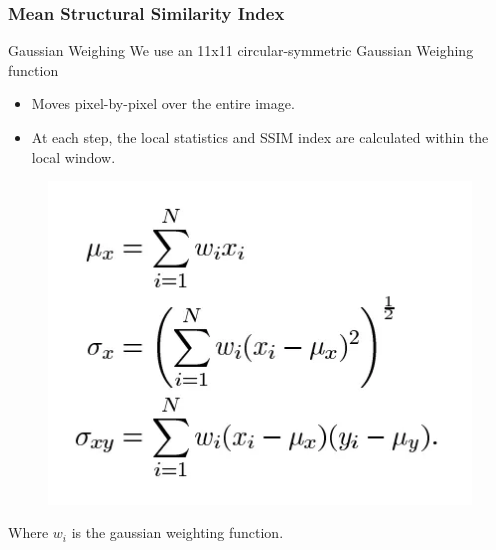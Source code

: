 \documentclass[13.5pt,aspecratio=169, xcolor=dvipsnames]{beamer}
\begin{document}
\begin{frame}
    \onehalfspacing
        \frametitle{Mean Structural Similarity Index}
        
        
        \begin{block}{Gaussian Weighing}
            We use an 11x11 circular-symmetric Gaussian Weighing function 
            \begin{itemize}
                \item Moves pixel-by-pixel over the entire image.
                \item At each step, the local statistics and SSIM index are calculated within the local window. 
            \end{itemize}
        \end{block}
        \begin{minipage}{0.6\textwidth}
            \begin{figure}
                \centering
                \includegraphics[width=0.9\linewidth]{gaussian_weighting.png}
            \end{figure}
        \end{minipage}
        \begin{minipage}{0.39\textwidth}
            \begin{center}
                Where $w_i$ is the gaussian weighting function.
            \end{center}
        \end{minipage}
       
\end{frame}
    
\end{document}
